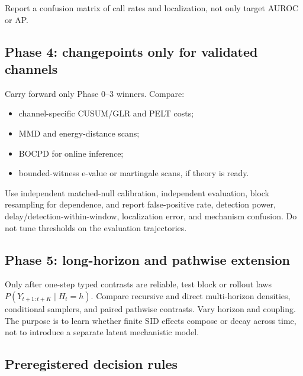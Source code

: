 \documentclass[10pt]{article}
\begin{document}
Report a confusion matrix of call rates and localization, not only target AUROC or AP.

\subsection{Phase 4: changepoints only for validated channels}

Carry forward only Phase 0--3 winners. Compare:

\begin{itemize}
  \item channel-specific CUSUM/GLR and PELT costs;
  \item MMD and energy-distance scans;
  \item BOCPD for online inference;
  \item bounded-witness e-value or martingale scans, if theory is ready.
\end{itemize}

Use independent matched-null calibration, independent evaluation, block resampling for dependence, and report false-positive rate, detection power, delay/detection-within-window, localization error, and mechanism confusion. Do not tune thresholds on the evaluation trajectories.

\subsection{Phase 5: long-horizon and pathwise extension}

Only after one-step typed contrasts are reliable, test block or rollout laws \(P(Y_{t+1:t+K}\mid H_t=h)\). Compare recursive and direct multi-horizon densities, conditional samplers, and paired pathwise contrasts. Vary horizon and coupling. The purpose is to learn whether finite SID effects compose or decay across time, not to introduce a separate latent mechanistic model.

\subsection{Preregistered decision rules}
\end{document}
